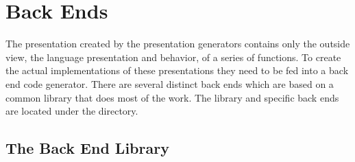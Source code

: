 

\chapter{Back Ends}
\label{cha:BE}

The presentation created by the presentation generators contains only the
outside view, the language presentation and behavior, of a series of functions.
To create the actual implementations of these presentations they need to be fed
into a back end code generator.  There are several distinct back ends which are
based on a common library that does most of the work.  The library and specific
back ends are located under the  directory.



\section{The Back End Library}
\label{sec:BE:The Back End Library}

